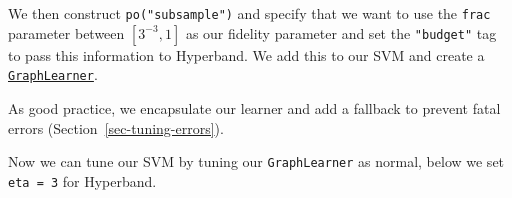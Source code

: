 We then construct \texttt{po("subsample")} and specify that we want to
use the \texttt{frac} parameter between \([3^{-3}, 1]\) as our fidelity
parameter and set the \texttt{"budget"} tag to pass this information to
Hyperband. We add this to our SVM and create a
\href{https://mlr3pipelines.mlr-org.com/reference/mlr_learners_graph.html}{\texttt{GraphLearner}}.

\begin{Shaded}
\begin{Highlighting}[]
\OtherTok{=} \NormalTok{(}
  \NormalTok{(}\NormalTok{, } \NormalTok{(}\NormalTok{(}\SpecialCharTok{\^{}{-}}\NormalTok{, }\NormalTok{, } \NormalTok{))) }\SpecialCharTok{\%\textgreater{}\textgreater{}\%}
\NormalTok{)}
\end{Highlighting}
\end{Shaded}

As good practice, we encapsulate our learner and add a fallback to
prevent fatal errors (Section~\ref{sec-tuning-errors}).

\begin{Shaded}
\begin{Highlighting}[]
\SpecialCharTok{$}\OtherTok{=} \NormalTok{(} \NormalTok{, } \NormalTok{)}
\SpecialCharTok{$}\OtherTok{=} \NormalTok{(} \NormalTok{, } \NormalTok{)}
\SpecialCharTok{$}\OtherTok{=} \NormalTok{(}\NormalTok{)}
\end{Highlighting}
\end{Shaded}

Now we can tune our SVM by tuning our \texttt{GraphLearner} as normal,
below we set \texttt{eta\ =\ 3} for Hyperband.

\begin{Shaded}
\begin{Highlighting}[]
\OtherTok{=} \NormalTok{(}\NormalTok{(}\NormalTok{, } \NormalTok{), }\NormalTok{(}
  \NormalTok{(}\NormalTok{, } \NormalTok{), }\NormalTok{(}\NormalTok{))}

\SpecialCharTok{$}
\end{Highlighting}
\end{Shaded}

